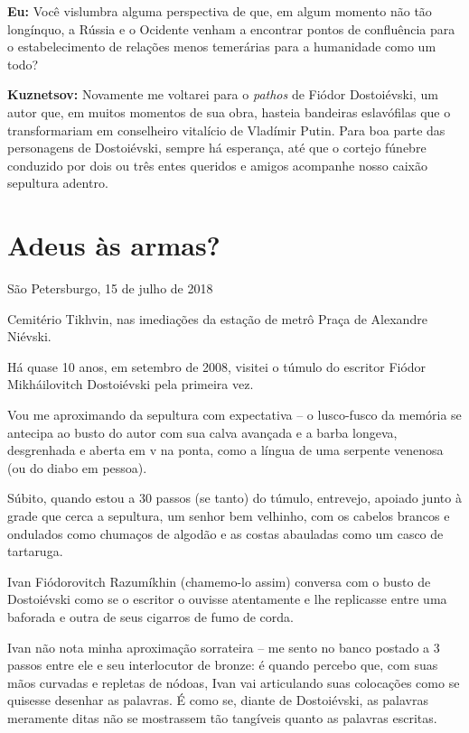\textbf{Eu:} Você vislumbra alguma perspectiva de que, em algum momento
não tão longínquo, a Rússia e o Ocidente venham a encontrar pontos de
confluência para o estabelecimento de relações menos temerárias para a
humanidade como um todo?

\textbf{Kuznetsov:} Novamente me voltarei para o \emph{pathos} de Fiódor
Dostoiévski, um autor que, em muitos momentos de sua obra, hasteia
bandeiras eslavófilas que o transformariam em conselheiro vitalício de
Vladímir Putin. Para boa parte das personagens de Dostoiévski, sempre há
esperança, até que o cortejo fúnebre conduzido por dois ou três entes
queridos e amigos acompanhe nosso caixão sepultura adentro.

\chapter*{Adeus às armas?}

\begin{flushright}
São Petersburgo, 15 de julho de 2018
\end{flushright}

Cemitério Tikhvin, nas imediações da estação de metrô Praça de Alexandre
Niévski.

Há quase 10 anos, em setembro de 2008, visitei o túmulo do escritor
Fiódor Mikháilovitch Dostoiévski pela primeira vez.

Vou me aproximando da sepultura com expectativa -- o lusco-fusco da
memória se antecipa ao busto do autor com sua calva avançada e a barba
longeva, desgrenhada e aberta em v na ponta, como a língua de uma
serpente venenosa (ou do diabo em pessoa).

Súbito, quando estou a 30 passos (se tanto) do túmulo, entrevejo,
apoiado junto à grade que cerca a sepultura, um senhor bem velhinho, com
os cabelos brancos e ondulados como chumaços de algodão e as costas
abauladas como um casco de tartaruga.

Ivan Fiódorovitch Razumíkhin (chamemo-lo assim) conversa com o busto de
Dostoiévski como se o escritor o ouvisse atentamente e lhe replicasse
entre uma baforada e outra de seus cigarros de fumo de corda.

Ivan não nota minha aproximação sorrateira -- me sento no banco postado
a 3 passos entre ele e seu interlocutor de bronze: é quando percebo que,
com suas mãos curvadas e repletas de nódoas, Ivan vai articulando suas
colocações como se quisesse desenhar as palavras. É como se, diante de
Dostoiévski, as palavras meramente ditas não se mostrassem tão tangíveis
quanto as palavras escritas.

